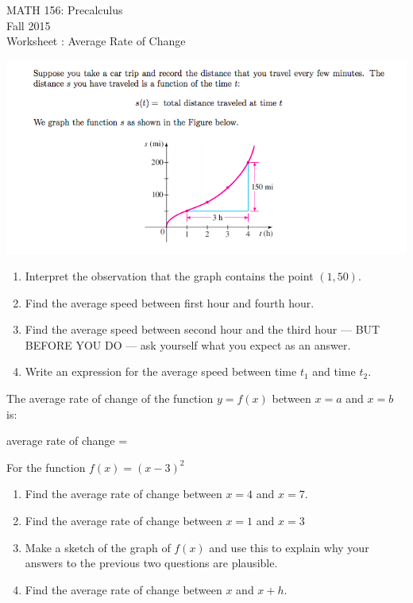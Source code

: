 \documentclass[11pt]{article}
\newcommand{\sect}{\textsection}
\begin{document}
 

\begin{center}MATH 156: Precalculus  \\ Fall 2015 \\ Worksheet \sect 2.4: Average Rate of Change\end{center}

\hrulefill

{}

\includegraphics[scale=0.8]{Sect_2_4_Intro.png}

\begin{enumerate}
\item Interpret the observation that the graph contains the point $(1,50)$.
\vspace{.4in}
\item Find the average speed between first hour and fourth hour.
\vfill
\item Find the average speed between second hour and the third hour  --- BUT BEFORE YOU DO ---  ask yourself what you expect as an answer.
\vfill
\item Write an expression for the average speed between time $t_1$ and time $t_2.$
\vfill
\end{enumerate}
\newpage

{} The average rate of change of the function $y=f(x)$ between $x=a$ and $x=b$ is:
\begin{center} average rate of change = \fbox{ \begin{minipage}{4in} \hfill\vspace{0.6in} \end{minipage} }  \end{center}
\vspace{2in}

{} For the function $f(x)=(x-3)^2$
\begin{enumerate}
\item Find the average rate of change between $x=4$ and $x=7.$
\vfill
\item Find the average rate of change between $x=1$ and $x=3$
\vfill
\item Make a sketch of the graph of $f(x)$ and use this to explain why your answers to the previous two questions are plausible.
\vfill
\item Find the average rate of change between $x$ and $x+h.$
\vfill
\end{enumerate}
\end{document}
